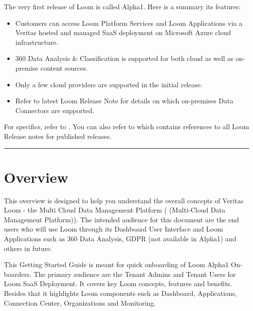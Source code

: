 \documentclass[letterpaper,10pt,english]{sphinxmanual}
\begin{document}
The very first release of Loom is called Alpha1.  Here is a summary its features:
\begin{itemize}
\item {} 
Customers can access Loom Platform Services and Loom Applications via a Veritas hosted and managed SaaS deployment on Microsoft Azure cloud infrastructure.

\item {} 
360 Data Analysis \& Classification is supported for both cloud as well as on-premise content sources.

\item {} 
Only a few cloud providers are supported in the initial release.

\item {} 
Refer to latest Loom Release Note for details on which on-premises Data Connectors are supported.

\end{itemize}

For specifics, refer to . You can also refer to  which contains references to all Loom Release notes for published releases.


\bigskip\hrule\bigskip



\chapter{Overview}
\label{\detokenize{loom_getting_started_guide:overview}}
This overview is designed to help you understand the overall concepts of Veritas Loom - the Multi Cloud Data Management Platform ( (Multi-Cloud Data Management Platform)). The intended audience for this document are the end users who will use Loom through its Dashboard User Interface and Loom Applications such as 360 Data Analysis, GDPR (not available in Alpha1) and others in future.

This Getting Started Guide is meant for quick onboarding of Loom Alpha1 On-boarders. The primary audience are the Tenant Admins and Tenant Users for Loom SaaS Deployment. It covers key Loom concepts, features and benefits. Besides that it highlights Loom components such as Dashboard, Applications, Connection Center, Organizations and Monitoring.
\end{document}
